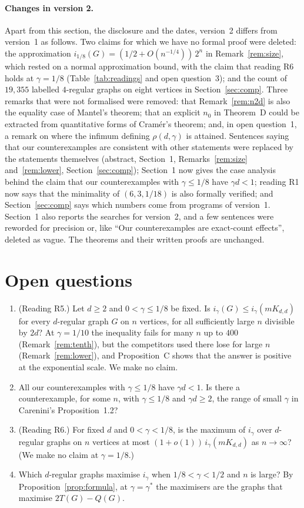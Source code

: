 \documentclass[11pt]{article}
\theoremstyle{remark}
\begin{document}
\paragraph{Changes in version 2.}
Apart from this section, the disclosure and the dates, version~2 differs from
version~1 as follows. Two claims for which we have no formal proof were
deleted: the approximation $i_{1/8}(G)=(1/2+O(n^{-1/4}))\,2^n$ in
Remark~\ref{rem:size}, which rested on a normal approximation bound, with the
claim that reading R6 holds at $\gamma=1/8$ (Table~\ref{tab:readings} and open
question~3); and the count of $19{,}355$ labelled $4$-regular graphs on eight
vertices in Section~\ref{sec:comp}. Three remarks that were not formalised
were removed: that Remark~\ref{rem:n2d} is also the equality case of Mantel's
theorem; that an explicit $n_0$ in Theorem~D could be extracted from
quantitative forms of Cramér's theorem; and, in open question~1, a remark on
where the infimum defining $\rho(d,\gamma)$ is attained. Sentences saying that
our counterexamples are consistent with other statements were replaced by the
statements themselves (abstract, Section~1, Remarks~\ref{rem:size}
and~\ref{rem:lower}, Section~\ref{sec:comp}); Section~1 now gives the case
analysis behind the claim that our counterexamples with $\gamma\le1/8$ have
$\gamma d<1$; reading R1 now says that the minimality of $(6,3,1/18)$ is also
formally verified; and Section~\ref{sec:comp} says which numbers come from
programs of version~1. Section~1 also reports the searches for version~2,
and a few sentences were reworded for precision or, like ``Our
counterexamples are exact-count effects'', deleted as vague. The theorems and
their written proofs are unchanged.

\section{Open questions}\label{sec:open}
\begin{enumerate}
\item (Reading R5.) Let $d\ge2$ and $0<\gamma\le1/8$ be fixed. Is
 $i_\gamma(G)\le i_\gamma(mK_{d,d})$ for every $d$-regular graph $G$ on $n$
 vertices, for all sufficiently large $n$ divisible by $2d$? At
 $\gamma=1/10$ the inequality fails for many $n$ up to $400$
 (Remark~\ref{rem:tenth}), but the competitors used there lose for large $n$
 (Remark~\ref{rem:lower}), and Proposition~C shows that the answer is
 positive at the exponential scale. We make no claim.
\item All our counterexamples with $\gamma\le1/8$ have $\gamma d<1$. Is
 there a counterexample, for some $n$, with $\gamma\le1/8$ and $\gamma d\ge2$,
 the range of small $\gamma$ in Carenini's Proposition~1.2?
\item (Reading R6.) For fixed $d$ and $0<\gamma<1/8$, is the maximum of
 $i_\gamma$ over $d$-regular graphs on $n$ vertices at most
 $(1+o(1))\,i_\gamma(mK_{d,d})$ as $n\to\infty$? (We make no claim at
 $\gamma=1/8$.)
\item Which $d$-regular graphs maximise $i_\gamma$ when $1/8<\gamma<1/2$ and
 $n$ is large? By Proposition~\ref{prop:formula}, at $\gamma=\gamma^*$ the
 maximisers are the graphs that maximise $2T(G)-Q(G)$.
\end{enumerate}
\end{document}
